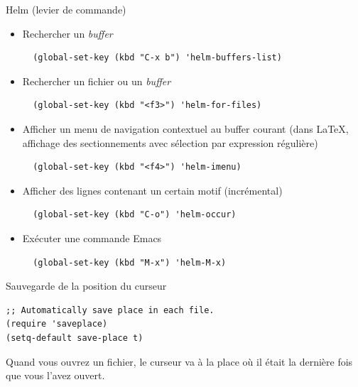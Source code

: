 \documentclass[t]{beamer}
\begin{document}
\begin{frame}[fragile,label={sec:org46dbb24}]{Helm (levier de commande)}
 \begin{itemize}
\item Rechercher un \emph{buffer}

\lstset{language=Lisp,label= ,caption= ,captionpos=b,numbers=none}
\begin{lstlisting}
  (global-set-key (kbd "C-x b") 'helm-buffers-list)
\end{lstlisting}

\item Rechercher un fichier ou un \emph{buffer}

\lstset{language=Lisp,label= ,caption= ,captionpos=b,numbers=none}
\begin{lstlisting}
  (global-set-key (kbd "<f3>") 'helm-for-files)
\end{lstlisting}

\item Afficher un menu de navigation contextuel au buffer courant (dans \LaTeX{},
affichage des sectionnements avec sélection par expression régulière)

\lstset{language=Lisp,label= ,caption= ,captionpos=b,numbers=none}
\begin{lstlisting}
  (global-set-key (kbd "<f4>") 'helm-imenu)
\end{lstlisting}

\item Afficher des lignes contenant un certain motif (incrémental)

\lstset{language=Lisp,label= ,caption= ,captionpos=b,numbers=none}
\begin{lstlisting}
  (global-set-key (kbd "C-o") 'helm-occur)
\end{lstlisting}

\item Exécuter une commande Emacs

\lstset{language=Lisp,label= ,caption= ,captionpos=b,numbers=none}
\begin{lstlisting}
  (global-set-key (kbd "M-x") 'helm-M-x)
\end{lstlisting}
\end{itemize}
\end{frame}

\begin{frame}[fragile,label={sec:orgf9b3782}]{Sauvegarde de la position du curseur}
 \lstset{language=Lisp,label= ,caption= ,captionpos=b,numbers=none}
\begin{lstlisting}
;; Automatically save place in each file.
(require 'saveplace)
(setq-default save-place t)
\end{lstlisting}

Quand vous ouvrez un fichier, le curseur va à la place où il était la dernière
fois que vous l'avez ouvert.
\end{frame}
\end{document}
